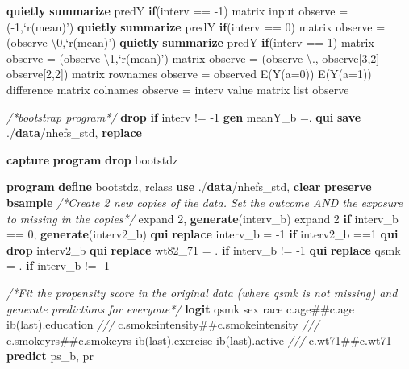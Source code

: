 \documentclass[
  10pt,
]{book}
\newenvironment{Shaded}{\begin{snugshade}}{\end{snugshade}}
\newcommand{\CommentTok}[1]{\textcolor[rgb]{0.56,0.35,0.01}{\textit{#1}}}
\newcommand{\FunctionTok}[1]{\textcolor[rgb]{0.00,0.00,0.00}{#1}}
\newcommand{\KeywordTok}[1]{\textcolor[rgb]{0.13,0.29,0.53}{\textbf{#1}}}
\newcommand{\NormalTok}[1]{#1}
\newcommand{\OtherTok}[1]{\textcolor[rgb]{0.56,0.35,0.01}{#1}}
\begin{document}
\begin{Shaded}
\begin{Highlighting}[]
\KeywordTok{quietly} \KeywordTok{summarize}\NormalTok{ predY }\KeywordTok{if}\NormalTok{(interv == -1)}
\FunctionTok{matrix}\NormalTok{ input observe = (-1,}\OtherTok{`r(mean)'}\NormalTok{)}
\KeywordTok{quietly} \KeywordTok{summarize}\NormalTok{ predY }\KeywordTok{if}\NormalTok{(interv == 0)}
\FunctionTok{matrix}\NormalTok{ observe = (observe \textbackslash{}0,}\OtherTok{`r(mean)'}\NormalTok{)}
\KeywordTok{quietly} \KeywordTok{summarize}\NormalTok{ predY }\KeywordTok{if}\NormalTok{(interv == 1)}
\FunctionTok{matrix}\NormalTok{ observe = (observe \textbackslash{}1,}\OtherTok{`r(mean)'}\NormalTok{)}
\FunctionTok{matrix}\NormalTok{ observe = (observe \textbackslash{}., observe[3,2]-observe[2,2]) }
\FunctionTok{matrix} \OtherTok{rownames}\NormalTok{ observe = observed E(Y(a=0)) E(Y(a=1)) difference}
\FunctionTok{matrix} \OtherTok{colnames}\NormalTok{ observe = interv }\OtherTok{value}
\FunctionTok{matrix} \OtherTok{list}\NormalTok{ observe }

\CommentTok{/*bootstrap program*/}
\KeywordTok{drop} \KeywordTok{if}\NormalTok{ interv != -1}
\KeywordTok{gen}\NormalTok{ meanY_b =.}
\KeywordTok{qui} \KeywordTok{save}\NormalTok{ ./}\KeywordTok{data}\NormalTok{/nhefs_std, }\KeywordTok{replace}

\KeywordTok{capture} \KeywordTok{program} \KeywordTok{drop}\NormalTok{ bootstdz}

\KeywordTok{program} \KeywordTok{define}\NormalTok{ bootstdz, rclass}
\KeywordTok{use}\NormalTok{ ./}\KeywordTok{data}\NormalTok{/nhefs_std, }\KeywordTok{clear}
\KeywordTok{preserve}
\KeywordTok{bsample} 
\CommentTok{/*Create 2 new copies of the data. }
\CommentTok{Set the outcome AND the exposure to missing in the copies*/}
\NormalTok{expand 2, }\KeywordTok{generate}\NormalTok{(interv_b)}
\NormalTok{expand 2 }\KeywordTok{if}\NormalTok{ interv_b == 0, }\KeywordTok{generate}\NormalTok{(interv2_b)}
\KeywordTok{qui} \KeywordTok{replace}\NormalTok{ interv_b = -1 }\KeywordTok{if}\NormalTok{ interv2_b ==1}
\KeywordTok{qui} \KeywordTok{drop}\NormalTok{ interv2_b}
\KeywordTok{qui} \KeywordTok{replace}\NormalTok{ wt82_71 = . }\KeywordTok{if}\NormalTok{ interv_b != -1}
\KeywordTok{qui} \KeywordTok{replace}\NormalTok{ qsmk = . }\KeywordTok{if}\NormalTok{ interv_b != -1}

\CommentTok{/*Fit the propensity score in the original data }
\CommentTok{(where qsmk is not missing) and generate predictions for everyone*/}
\KeywordTok{logit}\NormalTok{ qsmk sex race c.age##c.age ib(}\FunctionTok{last}\NormalTok{).education }\CommentTok{///}
\NormalTok{  c.smokeintensity##c.smokeintensity }\CommentTok{///}
\NormalTok{	c.smokeyrs##c.smokeyrs ib(}\FunctionTok{last}\NormalTok{).exercise ib(}\FunctionTok{last}\NormalTok{).active }\CommentTok{///}
\NormalTok{	c.wt71##c.wt71 }
\KeywordTok{predict}\NormalTok{ ps_b, pr}


\end{Highlighting}
\end{Shaded}
\end{document}
